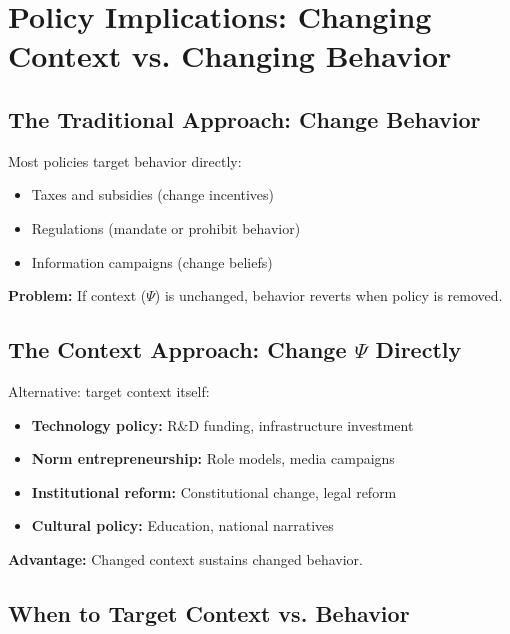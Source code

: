 
\section{Policy Implications: Changing Context vs. Changing Behavior}
\label{sec:context-policy}


\subsection{The Traditional Approach: Change Behavior}

Most policies target behavior directly:
\begin{itemize}[nosep]
  \item Taxes and subsidies (change incentives)
  \item Regulations (mandate or prohibit behavior)
  \item Information campaigns (change beliefs)
\end{itemize}

\textbf{Problem:} If context ($\Psi$) is unchanged, behavior reverts when policy is removed.

\subsection{The Context Approach: Change $\Psi$ Directly}

Alternative: target context itself:
\begin{itemize}[nosep]
  \item \textbf{Technology policy:} R\&D funding, infrastructure investment
  \item \textbf{Norm entrepreneurship:} Role models, media campaigns
  \item \textbf{Institutional reform:} Constitutional change, legal reform
  \item \textbf{Cultural policy:} Education, national narratives
\end{itemize}

\textbf{Advantage:} Changed context sustains changed behavior.

\subsection{When to Target Context vs. Behavior}

